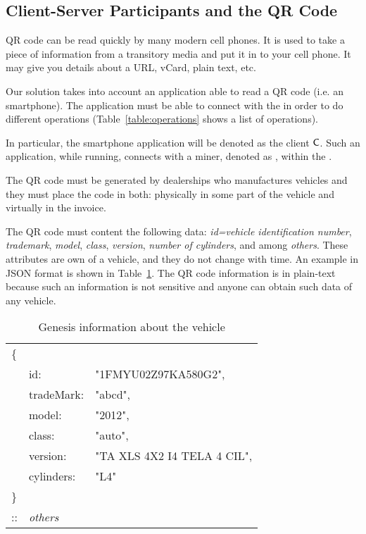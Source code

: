 \subsection{Client-Server Participants and the QR Code}
\label{ssec:clientServer}
QR code can be read quickly by many modern cell phones. It is used to take a piece of 
information from a transitory media and put it in to your cell phone. 
It may give you details about a URL, vCard, plain text, etc.

Our solution takes into account an application able to read a QR code (i.e. an smartphone).
The application must be able to connect with the \blockchaincarnetwork in order
to do different operations (Table~\ref{table:operations} shows a list of operations). 

In particular, the smartphone application will be denoted as the client $\textsf{C}$. 
Such an application, while running, connects with a miner, denoted as \Server, within the \blockchaincarnetwork.


The QR code must be generated by dealerships who manufactures vehicles and they must place the code
in both: physically in some part of the vehicle and virtually in the invoice.

The QR code must content the following data: 
\textit{id=vehicle identification number}, 
\textit{trademark}, 
\textit{model}, 
\textit{class}, 
\textit{version}, 
\textit{number of cylinders}, and
among \textit{others}. These attributes are own of a vehicle, and they do not 
change with time. An example in JSON format is shown in Table~\ref{table:genesisInfo}.
The QR code information is in plain-text because such an information is not sensitive and anyone can obtain such data of any vehicle.
\begin{table}[h]
    \centering
    \caption{Genesis information about the vehicle}
    \begin{tabular}{lll}
       \{&         			&    							\\
         & id:        		& "1FMYU02Z97KA580G2", 			\\
         & tradeMark: 		& "abcd", 						\\
         & model:     		& "2012", 						\\
         & class:     		& "auto", 						\\
         & version:   		& "TA XLS 4X2 I4 TELA 4 CIL", 	\\
         & cylinders: 		& "L4" 							\\
       \}& 		        	& 								\\
       ::& \textit{others}	&								\\
    \end{tabular}
    \label{table:genesisInfo}
\end{table}





